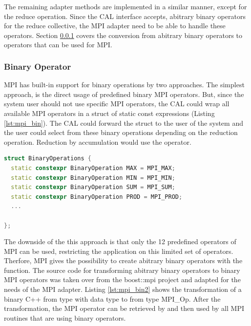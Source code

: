 The remaining adapter methods are implemented in a similar manner,
except for the reduce operation. Since the CAL interface accepts,
abitrary binary operators for the reduce collective, the MPI
adapter need to be able to handle these operators. Section
\ref{sec:bin_operator} covers the conversion from abitrary
binary operators to operators that can be used for MPI.

\subsubsection{Binary Operator}
\label{sec:bin_operator}

MPI has built-in support for binary operations by two approaches. The
simplest approach, is the direct usage of predefined binary MPI
operators\cite{ref:mpi_bin_op}. But, since the system user should not
use specific MPI operators, the CAL could wrap all available MPI
operators in a struct of static const expressions (Listing
\ref{lst:mpi_bin}).  The CAL could forward the struct to the user of
the system and the user could select from these binary operations
depending on the reduction operation. Reduction by accumulation would
use the  operator.


\begin{lstlisting}[language=C++, caption={A small collection of binary operators by transformed MPI operations to static constexpression }, label=lst:mpi_bin]
struct BinaryOperations { 
  static constexpr BinaryOperation MAX = MPI_MAX; 
  static constexpr BinaryOperation MIN = MPI_MIN; 
  static constexpr BinaryOperation SUM = MPI_SUM; 
  static constexpr BinaryOperation PROD = MPI_PROD; 
  ...

};
\end{lstlisting}


The downside of the this approach is that only the 12 predefined
operators of MPI can be used, restricting the application on this
limited set of operators. Therfore, MPI gives the possibility to
create abitrary binary operators with the 
function.  The source code for transforming abitrary binary operators
to binary MPI operators was taken over from the boost::mpi project
\cite{ref:boost_mpi} and adapted for the needs of the MPI adapter.
Listing \ref{lst:mpi_bin2} shows the transformation of a binary C++
 from type  with data type
 to  from type {MPI\_Op}.  After the
transformation, the MPI operator can be retrieved by
 and then used by all MPI routines that
are using binary operators.

